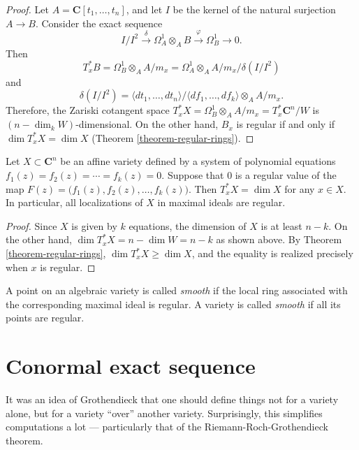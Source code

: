 \begin{proof}
Let $A=\mathbf{C}[t_1,\dots,t_n]$, and let
$I$ be the kernel of the natural surjection
$A \to B$. Consider the exact sequence
$$
I/I^2 \xrightarrow{\delta}
\Omega^1_A \otimes_A B
\xrightarrow{\varphi}
\Omega^1_B \to 0.
$$
Then
$$
T_x^\ast B
=\Omega^1_B \otimes_A A/m_x
=\Omega^1_A \otimes_A A/m_x
\big/ \delta(I/I^2)
$$
and
$$
\delta(I/I^2)
=\langle dt_1,\dots,dt_n\rangle
\big/\langle df_1,\dots,df_k\rangle
\otimes_A A/m_x.
$$
Therefore, the Zariski cotangent space
$T_x^\ast X
=\Omega^1_B\otimes_A A/m_x
=T_x^\ast \mathbf{C}^n/W$
is $(n-\dim_k W)$-dimensional. On the other
hand, $B_x$ is regular if and only if
$\dim T_x^\ast X = \dim X$
(Theorem \ref{theorem-regular-rings}).
\end{proof}

\begin{corollary}
\label{lemma-regular-values-affine-variety}
Let $X \subset \mathbf{C}^n$ be an affine
variety defined by a system of polynomial
equations
$f_1(z)=f_2(z)=\cdots=f_k(z)=0$.
Suppose that $0$ is a regular value of the
map
$F(z)=\bigl(f_1(z),f_2(z),\dots,f_k(z)\bigr)$.
Then $T_x^\ast X = \dim X$ for any
$x \in X$.
In particular, all localizations of $X$
in maximal ideals are regular.
\end{corollary}

\begin{proof}
Since $X$ is given by $k$ equations,
the dimension of $X$ is at least $n-k$.
On the other hand,
$\dim T_x^\ast X = n-\dim W = n-k$
as shown above. By Theorem
\ref{theorem-regular-rings},
$\dim T_x^\ast X \geq \dim X$, and the
equality is realized precisely when $x$ is
regular.
\end{proof}

\begin{definition}
\label{definition-smooth-point-variety}
A point on an algebraic variety is called
{\it smooth} if the local ring associated
with the corresponding maximal ideal is
regular. A variety is called {\it smooth}
if all its points are regular.
\end{definition}

\section{Conormal exact sequence}
\label{section-conormal-exact-sequence}

\noindent
It was an idea of Grothendieck
that one should define things not for
a variety alone, but for a variety
``over'' another variety.
Surprisingly, this simplifies computations
a lot --- particularly that of the
Riemann-Roch-Grothendieck theorem.


